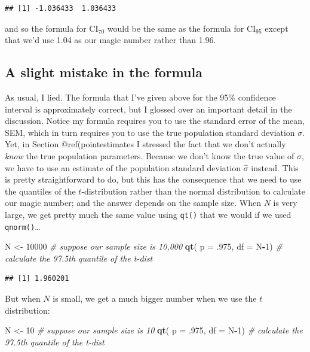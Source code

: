\documentclass[spanish,]{book}
\newenvironment{Shaded}{\begin{snugshade}}{\end{snugshade}}
\newcommand{\KeywordTok}[1]{\textcolor[rgb]{0.13,0.29,0.53}{\textbf{#1}}}
\newcommand{\DataTypeTok}[1]{\textcolor[rgb]{0.13,0.29,0.53}{#1}}
\newcommand{\DecValTok}[1]{\textcolor[rgb]{0.00,0.00,0.81}{#1}}
\newcommand{\StringTok}[1]{\textcolor[rgb]{0.31,0.60,0.02}{#1}}
\newcommand{\CommentTok}[1]{\textcolor[rgb]{0.56,0.35,0.01}{\textit{#1}}}
\newcommand{\OperatorTok}[1]{\textcolor[rgb]{0.81,0.36,0.00}{\textbf{#1}}}
\newcommand{\NormalTok}[1]{#1}
\begin{document}
\begin{verbatim}
## [1] -1.036433  1.036433
\end{verbatim}

and so the formula for \(\mbox{CI}_{70}\) would be the same as the
formula for \(\mbox{CI}_{95}\) except that we'd use 1.04 as our magic
number rather than 1.96.

\subsection{A slight mistake in the
formula}\label{a-slight-mistake-in-the-formula}

As usual, I lied. The formula that I've given above for the 95\%
confidence interval is approximately correct, but I glossed over an
important detail in the discussion. Notice my formula requires you to
use the standard error of the mean, SEM, which in turn requires you to
use the true population standard deviation \(\sigma\). Yet, in Section
@ref(pointestimates I stressed the fact that we don't actually
\emph{know} the true population parameters. Because we don't know the
true value of \(\sigma\), we have to use an estimate of the population
standard deviation \(\hat{\sigma}\) instead. This is pretty
straightforward to do, but this has the consequence that we need to use
the quantiles of the \(t\)-distribution rather than the normal
distribution to calculate our magic number; and the answer depends on
the sample size. When \(N\) is very large, we get pretty much the same
value using \texttt{qt()} that we would if we used
\texttt{qnorm()}\ldots{}

\begin{Shaded}
\begin{Highlighting}[]
\NormalTok{N <-}\StringTok{ }\DecValTok{10000}   \CommentTok{# suppose our sample size is 10,000}
\KeywordTok{qt}\NormalTok{( }\DataTypeTok{p =}\NormalTok{ .}\DecValTok{975}\NormalTok{, }\DataTypeTok{df =}\NormalTok{ N}\OperatorTok{-}\DecValTok{1}\NormalTok{)   }\CommentTok{# calculate the 97.5th quantile of the t-dist}
\end{Highlighting}
\end{Shaded}

\begin{verbatim}
## [1] 1.960201
\end{verbatim}

But when \(N\) is small, we get a much bigger number when we use the
\(t\) distribution:

\begin{Shaded}
\begin{Highlighting}[]
\NormalTok{N <-}\StringTok{ }\DecValTok{10}   \CommentTok{# suppose our sample size is 10}
\KeywordTok{qt}\NormalTok{( }\DataTypeTok{p =}\NormalTok{ .}\DecValTok{975}\NormalTok{, }\DataTypeTok{df =}\NormalTok{ N}\OperatorTok{-}\DecValTok{1}\NormalTok{)   }\CommentTok{# calculate the 97.5th quantile of the t-dist}
\end{Highlighting}
\end{Shaded}
\end{document}
